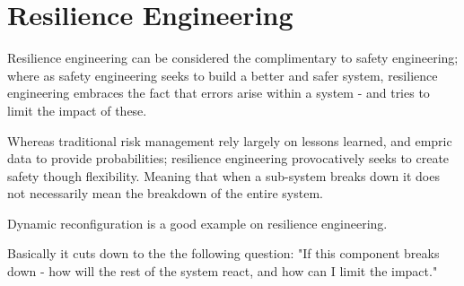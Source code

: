 \section{Resilience Engineering}
\label{sec:resilience_engineering}
Resilience engineering can be considered the complimentary to safety engineering; where as safety engineering seeks to build a better and safer system, resilience engineering embraces the fact that errors arise within a system - and tries to limit the impact of these.

Whereas traditional risk management rely largely on lessons learned, and empric data to provide probabilities; resilience engineering provocatively seeks to create safety though flexibility. Meaning that when a sub-system breaks down it does not necessarily mean the breakdown of the entire system.

Dynamic reconfiguration is a good example on resilience engineering.

Basically it cuts down to the the following question: "If this component breaks down - how will the rest of the system react, and how can I limit the impact."


